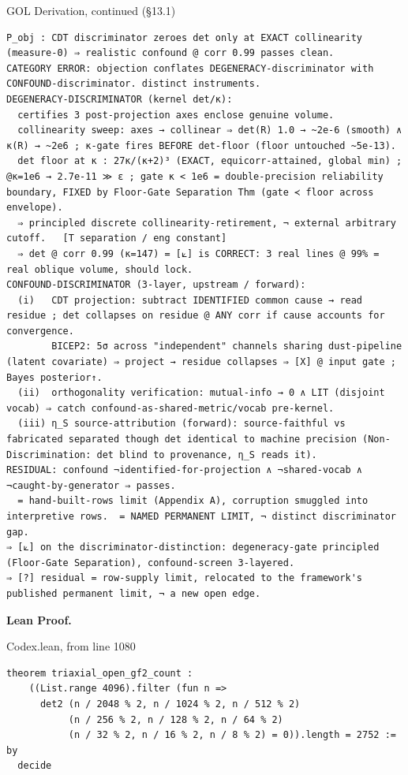 \documentclass[10pt,twocolumn]{article}
\begin{document}
\begin{golbox}{GOL Derivation, continued (§13.1)}
\begin{lstlisting}[style=golv]
P_obj : CDT discriminator zeroes det only at EXACT collinearity (measure-0) ⇒ realistic confound @ corr 0.99 passes clean.
CATEGORY ERROR: objection conflates DEGENERACY-discriminator with CONFOUND-discriminator. distinct instruments.
DEGENERACY-DISCRIMINATOR (kernel det/κ):
  certifies 3 post-projection axes enclose genuine volume.
  collinearity sweep: axes → collinear ⇒ det(R) 1.0 → ~2e-6 (smooth) ∧ κ(R) → ~2e6 ; κ-gate fires BEFORE det-floor (floor untouched ~5e-13).
  det floor at κ : 27κ/(κ+2)³ (EXACT, equicorr-attained, global min) ; @κ=1e6 → 2.7e-11 ≫ ε ; gate κ < 1e6 = double-precision reliability boundary, FIXED by Floor-Gate Separation Thm (gate ≺ floor across envelope).
  ⇒ principled discrete collinearity-retirement, ¬ external arbitrary cutoff.   [T separation / eng constant]
  ⇒ det @ corr 0.99 (κ=147) = [⟀] is CORRECT: 3 real lines @ 99% = real oblique volume, should lock.
CONFOUND-DISCRIMINATOR (3-layer, upstream / forward):
  (i)   CDT projection: subtract IDENTIFIED common cause → read residue ; det collapses on residue @ ANY corr if cause accounts for convergence.
        BICEP2: 5σ across "independent" channels sharing dust-pipeline (latent covariate) ⇒ project → residue collapses ⇒ [X] @ input gate ; Bayes posterior↑.
  (ii)  orthogonality verification: mutual-info → 0 ∧ LIT (disjoint vocab) ⇒ catch confound-as-shared-metric/vocab pre-kernel.
  (iii) η_S source-attribution (forward): source-faithful vs fabricated separated though det identical to machine precision (Non-Discrimination: det blind to provenance, η_S reads it).
RESIDUAL: confound ¬identified-for-projection ∧ ¬shared-vocab ∧ ¬caught-by-generator ⇒ passes.
  = hand-built-rows limit (Appendix A), corruption smuggled into interpretive rows.  = NAMED PERMANENT LIMIT, ¬ distinct discriminator gap.
⇒ [⟀] on the discriminator-distinction: degeneracy-gate principled (Floor-Gate Separation), confound-screen 3-layered.
⇒ [?] residual = row-supply limit, relocated to the framework's published permanent limit, ¬ a new open edge.
\end{lstlisting}
\end{golbox}

\textbf{Lean Proof.}

\begin{leanexcerpt}{Codex.lean, from line 1080}
\begin{lstlisting}[style=leanx,firstnumber=1080]
theorem triaxial_open_gf2_count :
    ((List.range 4096).filter (fun n =>
      det2 (n / 2048 % 2, n / 1024 % 2, n / 512 % 2)
           (n / 256 % 2, n / 128 % 2, n / 64 % 2)
           (n / 32 % 2, n / 16 % 2, n / 8 % 2) = 0)).length = 2752 := by
  decide
\end{lstlisting}
\end{leanexcerpt}
\end{document}
